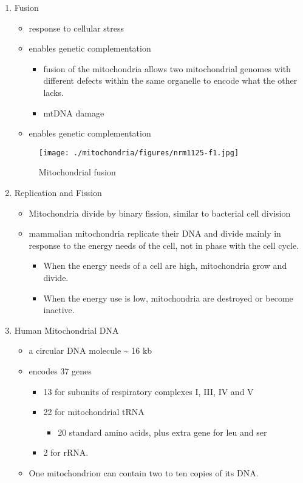 \documentclass{scrartcl}
\begin{document}
\begin{enumerate}
\item Fusion
\label{sec:org3ebb622}
\begin{itemize}
\item response to cellular stress
\item enables genetic complementation
\begin{itemize}
\item fusion of the mitochondria allows two mitochondrial genomes with
different defects within the same organelle to encode what the
other lacks.
\item mtDNA damage
\end{itemize}
\item enables genetic complementation
\end{itemize}


\begin{figure}[htbp]
\centering
\texttt{[image: ./mitochondria/figures/nrm1125-f1.jpg]}
\caption[fusion]{\label{fig:org40645dc}
Mitochondrial fusion}
\end{figure}

\item Replication and Fission
\label{sec:orga0304b0}

\begin{itemize}
\item Mitochondria divide by binary fission, similar to bacterial cell division

\item mammalian mitochondria replicate their DNA and divide mainly in response
to the energy needs of the cell, not in phase with the cell cycle.
\begin{itemize}
\item When the energy needs of a cell are high, mitochondria grow and
divide.
\item When the energy use is low, mitochondria are destroyed
or become inactive.
\end{itemize}
\end{itemize}

\item Human Mitochondrial DNA
\label{sec:orgfcf9e0b}
\begin{itemize}
\item a circular DNA molecule \textasciitilde{} 16 kb
\item encodes 37 genes
\begin{itemize}
\item 13 for subunits of respiratory complexes I, III, IV and V
\item 22 for mitochondrial tRNA
\begin{itemize}
\item 20 standard amino acids, plus extra gene for leu and ser
\end{itemize}
\item 2 for rRNA.
\end{itemize}
\item One mitochondrion can contain two to ten copies of its DNA.
\end{itemize}


\end{enumerate}
\end{document}
